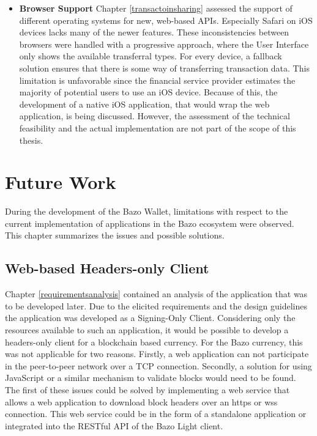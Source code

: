 \begin{itemize}
\item \textbf{Browser Support}
Chapter \ref{transactoinsharing} assessed the support of different operating systems for new, web-based APIs. Especially Safari on iOS devices lacks many of the newer features. These inconsistencies between browsers were handled with a progressive approach, where the User Interface only shows the available transferral types. For every device, a fallback solution ensures that there is some way of transferring transaction data.
This limitation is unfavorable since the financial service provider estimates the majority of potential users to use an iOS device. Because of this, the development of a native iOS application, that would wrap the web application, is being discussed. However, the assessment of the technical feasibility and the actual implementation are not part of the scope of this thesis.

\end{itemize}

\newpage

\chapter{Future Work}\label{futurework}
During the development of the Bazo Wallet, limitations with respect to the current implementation of applications in the Bazo ecosystem were observed. This chapter summarizes the issues and possible solutions.

\section{Web-based Headers-only Client}
Chapter \ref{requirementsanalysis} contained an analysis of the application that was to be developed later. Due to the elicited requirements and the design guidelines the application was developed as a Signing-Only Client. Considering only the resources available to such an application, it would be possible to develop a headers-only client for a blockchain based currency. For the Bazo currency, this was not applicable for two reasons. Firstly, a web application can not participate in the peer-to-peer network over a TCP connection. Secondly, a solution for using JavaScript or a similar mechanism to validate blocks would need to be found. The first of these issues could be solved by implementing a web service that allows a web application to download block headers over an https or wss connection. This web service could be in the form of a standalone application or integrated into the RESTful API of the Bazo Light client.

